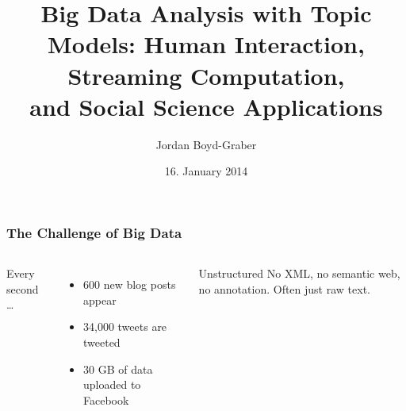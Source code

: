 \documentclass[compress]{beamer}
\title{Big Data Analysis with Topic Models: Human Interaction, Streaming Computation, \\and Social Science Applications}
\author{Jordan Boyd-Graber}
\date{16. January 2014}
\begin{document}




\begin{frame}
\frametitle{The Challenge of Big Data}

\begin{columns}


Every second \dots
\begin{itemize}
  \item 600 new blog posts appear
  \item 34,000 tweets are tweeted
  \item 30 GB of data uploaded to Facebook
\end{itemize}
\pause

\begin{block}{Unstructured}
  No XML, no semantic web, no annotation.  Often just raw text.
\end{block}



\end{columns}

\end{frame}
\end{document}
